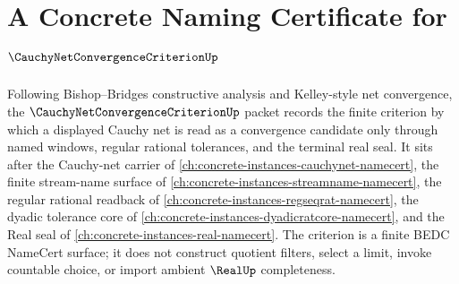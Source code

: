 \chapter{A Concrete Naming Certificate for $\CauchyNetConvergenceCriterionUp$}
\label{ch:concrete-instances-cauchy-net-convergence-criterion-namecert}

Following Bishop--Bridges constructive analysis and Kelley-style net convergence, the $\CauchyNetConvergenceCriterionUp$ packet records the finite criterion by which a displayed Cauchy net is read as a convergence candidate only through named windows, regular rational tolerances, and the terminal real seal. It sits after the Cauchy-net carrier of \autoref{ch:concrete-instances-cauchynet-namecert}, the finite stream-name surface of \autoref{ch:concrete-instances-streamname-namecert}, the regular rational readback of \autoref{ch:concrete-instances-regseqrat-namecert}, the dyadic tolerance core of \autoref{ch:concrete-instances-dyadicratcore-namecert}, and the Real seal of \autoref{ch:concrete-instances-real-namecert}. The criterion is a finite BEDC NameCert surface; it does not construct quotient filters, select a limit, invoke countable choice, or import ambient $\RealUp$ completeness.

